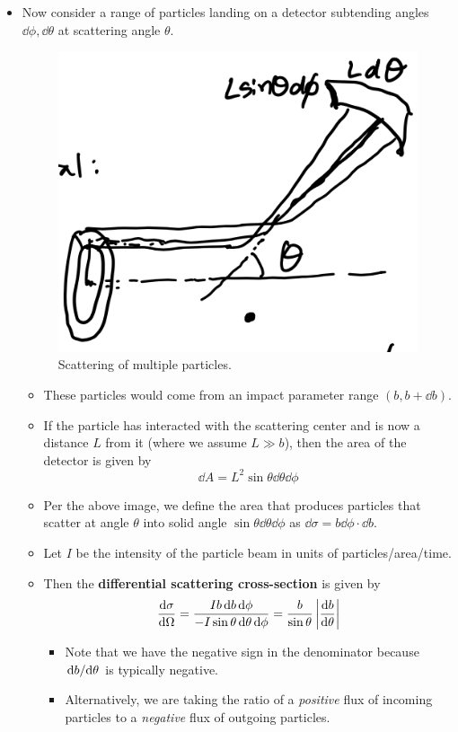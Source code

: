 \documentclass[../notes.tex]{subfiles}
\begin{document}
\begin{itemize}
\begin{itemize}
    \end{itemize}
    \item Now consider a range of particles landing on a detector subtending angles $\dd{\phi},\dd{\theta}$ at scattering angle $\theta$.
    \begin{figure}[h!]
        \centering
        \includegraphics[width=0.3\linewidth]{../ExtFiles/scatteringMP.png}
        \caption{Scattering of multiple particles.}
        \label{fig:scatteringMP}
    \end{figure}
    \begin{itemize}
        \item These particles would come from an impact parameter range $(b,b+\dd{b})$.
        \item If the particle has interacted with the scattering center and is now a distance $L$ from it (where we assume $L\gg b$), then the area of the detector is given by
        \begin{equation*}
            \dd{A} = L^2\sin\theta\dd{\theta}\dd{\phi}
        \end{equation*}
        \item Per the above image, we define the area that produces particles that scatter at angle $\theta$ into solid angle $\sin\theta\dd{\theta}\dd{\phi}$ as $\dd\sigma=b\dd{\phi}\cdot\dd{b}$.
        \item Let $I$ be the intensity of the particle beam in units of particles/area/time.
        \item Then the \textbf{differential scattering cross-section} is given by
        \begin{equation*}
            \dv{\sigma}{\Omega} = \frac{Ib\dd{b}\dd{\phi}}{-I\sin\theta\dd{\theta}\dd{\phi}}
            = \frac{b}{\sin\theta}\left| \dv{b}{\theta} \right|
        \end{equation*}
        \begin{itemize}
            \item Note that we have the negative sign in the denominator because $\dv*{b}{\theta}$ is typically negative.
            \item Alternatively, we are taking the ratio of a \emph{positive} flux of incoming particles to a \emph{negative} flux of outgoing particles.

\end{itemize}
\end{itemize}
\end{itemize}
\end{document}
